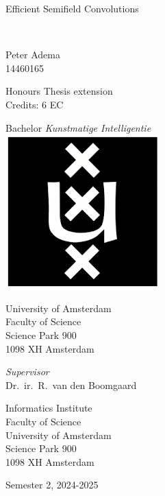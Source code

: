 \documentclass[a4paper, 12pt]{report}
\newcommand{\theTitle}{Efficient Semifield Convolutions}
\newcommand{\theSubTitle}{}
\newcommand{\theAuthor}{Peter Adema}
\newcommand{\theStudentID}{14460165}
\newcommand{\theSupervisor}{Dr.\ ir.\ R.\ van den Boomgaard} %
\newcommand{\theInstitute}{
Informatics Institute \\ %
Faculty of Science\\
University of Amsterdam\\
Science Park 900 \\ 
1098 XH Amsterdam 
}
\newcommand{\theDate}{Semester 2, 2024-2025}
\begin{document}
\pagestyle{empty}
\begin{center}

\vspace{2.5cm}


\begin{Huge}
\theTitle
\end{Huge} \\

\vspace{0.5 cm}

\begin{Large}
\theSubTitle
\end{Large}

\vspace{1.5cm}

\theAuthor\\
\theStudentID

\vspace{1.5cm}

Honours Thesis extension\\
Credits: 6 EC

\vspace{0.5cm}

Bachelor \textit{Kunstmatige Intelligentie} \\
\vspace{0.25cm}
\includegraphics[width=0.075\paperwidth]{figures/uva_logo} \\
\vspace{0.1cm}

University of Amsterdam\\
Faculty of Science\\
Science Park 900\\
1098 XH Amsterdam

\vspace{2cm}

\emph{Supervisor}\\

\theSupervisor

\vspace{0.25cm}

\theInstitute

\vspace{1.0cm}

\theDate

\end{center}
\end{document}
